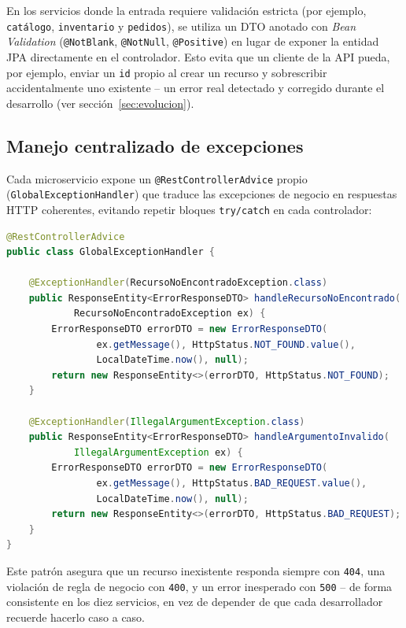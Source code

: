 En los servicios donde la entrada requiere validación estricta (por ejemplo,
\texttt{catálogo}, \texttt{inventario} y \texttt{pedidos}), se utiliza un DTO anotado
con \textit{Bean Validation} (\texttt{@NotBlank}, \texttt{@NotNull}, \texttt{@Positive})
en lugar de exponer la entidad JPA directamente en el controlador. Esto evita que un
cliente de la API pueda, por ejemplo, enviar un \texttt{id} propio al crear un recurso
y sobrescribir accidentalmente uno existente -- un error real detectado y corregido
durante el desarrollo (ver sección~\ref{sec:evolucion}).

\subsection{Manejo centralizado de excepciones}

Cada microservicio expone un \texttt{@RestControllerAdvice} propio
(\texttt{GlobalExceptionHandler}) que traduce las excepciones de negocio en respuestas
HTTP coherentes, evitando repetir bloques \texttt{try/catch} en cada controlador:

\begin{lstlisting}[language=Java, caption={GlobalExceptionHandler.java (catálogo) -- fragmento}]
@RestControllerAdvice
public class GlobalExceptionHandler {

    @ExceptionHandler(RecursoNoEncontradoException.class)
    public ResponseEntity<ErrorResponseDTO> handleRecursoNoEncontrado(
            RecursoNoEncontradoException ex) {
        ErrorResponseDTO errorDTO = new ErrorResponseDTO(
                ex.getMessage(), HttpStatus.NOT_FOUND.value(),
                LocalDateTime.now(), null);
        return new ResponseEntity<>(errorDTO, HttpStatus.NOT_FOUND);
    }

    @ExceptionHandler(IllegalArgumentException.class)
    public ResponseEntity<ErrorResponseDTO> handleArgumentoInvalido(
            IllegalArgumentException ex) {
        ErrorResponseDTO errorDTO = new ErrorResponseDTO(
                ex.getMessage(), HttpStatus.BAD_REQUEST.value(),
                LocalDateTime.now(), null);
        return new ResponseEntity<>(errorDTO, HttpStatus.BAD_REQUEST);
    }
}
\end{lstlisting}

Este patrón asegura que un recurso inexistente responda siempre con \texttt{404}, una
violación de regla de negocio con \texttt{400}, y un error inesperado con \texttt{500}
-- de forma consistente en los diez servicios, en vez de depender de que cada
desarrollador recuerde hacerlo caso a caso.

